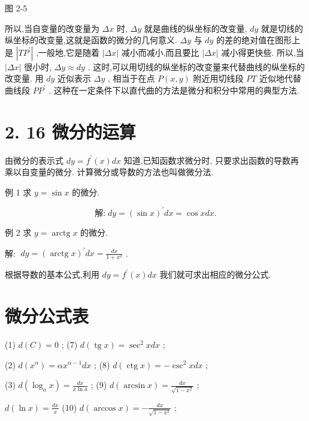 \documentclass[10pt]{article}
\begin{document}
图 2-5

所以,当自变量的改变量为 \({\Delta x}\) 时, \({\Delta y}\) 就是曲线的纵坐标的改变量, \({dy}\) 就是切线的纵坐标的改变量,这就是函数的微分的几何意义. \({\Delta y}\) 与 \({dy}\) 的差的绝对值在图形上是 \(\left| {T{P}^{\prime }}\right|\) ,一般地,它是随着 \(\left| {\Delta x}\right|\) 减小而减小,而且要比 \(\left| {\Delta x}\right|\) 减小得更快些. 所以,当 \(\left| {\Delta x}\right|\) 很小时, \({\Delta y} \approx {dy}\) . 这时,可以用切线的纵坐标的改变量来代替曲线的纵坐标的改变量. 用 \({dy}\) 近似表示 \({\Delta y}\) , 相当于在点 \(P\left( {x,y}\right)\) 附近用切线段 \({PT}\) 近似地代替曲线段 \(P{P}^{\prime }\) . 这种在一定条件下以直代曲的方法是微分和积分中常用的典型方法.

\section*{2. 16 微分的运算}

由微分的表示式 \({dy} = {f}^{\prime }\left( x\right) {dx}\) 知道,已知函数求微分时, 只要求出函数的导数再乘以自变量的微分. 计算微分或导数的方法也叫做微分法.

例 1 求 \(y = \sin x\) 的微分.

\[
\text{解:}\;{dy} = {\left( \sin x\right) }^{\prime }{dx} = \cos {xdx}\text{.}
\]

例 2 求 \(y = \operatorname{arctg}x\) 的微分.

解: \(\;{dy} = {\left( \operatorname{arctg}x\right) }^{\prime }{dx} = \frac{dx}{1 + {x}^{2}}\) .

根据导数的基本公式,利用 \({dy} = {f}^{\prime }\left( x\right) {dx}\) 我们就可求出相应的微分公式.

\section*{微分公式表}

(1) \(d\left( C\right) = 0\) ; (7) \(d\left( {\operatorname{tg}x}\right) = {\sec }^{2}{xdx}\) ;

(2) \(d\left( {x}^{\alpha }\right) = \alpha {x}^{\alpha - 1}{dx}\) ; (8) \(d\left( {\operatorname{ctg}x}\right) = - {\csc }^{2}{xdx}\) ;

(3) \(d\left( {{\log }_{a}x}\right) = \frac{dx}{x\ln a}\) ; (9) \(d\left( {\arcsin x}\right) = \frac{dx}{\sqrt{1 - {x}^{2}}}\) ;

\(d\left( {\ln x}\right) = \frac{dx}{x}\) (10) \(d\left( {\arccos x}\right) = - \frac{dx}{\sqrt{1 - {x}^{2}}}\) ;
\end{document}
